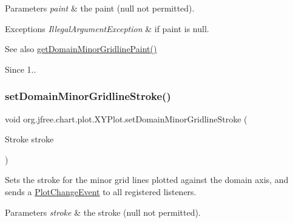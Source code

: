 \begin{DoxyParams}{Parameters}
{\em paint} & the paint ({\ttfamily null} not permitted).\\
\hline
\end{DoxyParams}

\begin{DoxyExceptions}{Exceptions}
{\em Illegal\+Argument\+Exception} & if {\ttfamily paint} is {\ttfamily null}.\\
\hline
\end{DoxyExceptions}
\begin{DoxySeeAlso}{See also}
\mbox{\hyperlink{classorg_1_1jfree_1_1chart_1_1plot_1_1_x_y_plot_a667ca270fdac660473ef80d4ff591b01}{get\+Domain\+Minor\+Gridline\+Paint()}}
\end{DoxySeeAlso}
\begin{DoxySince}{Since}
1.. 
\end{DoxySince}
\mbox{\label{classorg_1_1jfree_1_1chart_1_1plot_1_1_x_y_plot_ab089f2868ebbb6fc14260b23ca95d553}} 
\subsubsection{\texorpdfstring{set\+Domain\+Minor\+Gridline\+Stroke()}{setDomainMinorGridlineStroke()}}
{\footnotesize\ttfamily void org.\+jfree.\+chart.\+plot.\+X\+Y\+Plot.\+set\+Domain\+Minor\+Gridline\+Stroke (\begin{DoxyParamCaption}\item[{Stroke}]{stroke }\end{DoxyParamCaption})}

Sets the stroke for the minor grid lines plotted against the domain axis, and sends a \mbox{\hyperlink{}{Plot\+Change\+Event}} to all registered listeners.


\begin{DoxyParams}{Parameters}
{\em stroke} & the stroke ({\ttfamily null} not permitted).\\
\hline
\end{DoxyParams}

